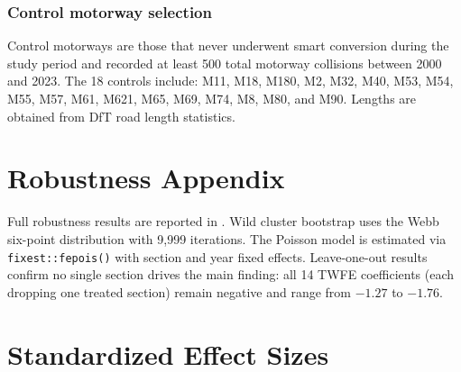 \documentclass[12pt]{article}
\begin{document}
\subsubsection*{Control motorway selection} Control motorways are those that never underwent smart conversion during the study period and recorded at least 500 total motorway collisions between 2000 and 2023. The 18 controls include: M11, M18, M180, M2, M32, M40, M53, M54, M55, M57, M61, M621, M65, M69, M74, M8, M80, and M90. Lengths are obtained from DfT road length statistics.

\section{Robustness Appendix}

Full robustness results are reported in . Wild cluster bootstrap uses the Webb six-point distribution with 9,999 iterations. The Poisson model is estimated via \texttt{fixest::fepois()} with section and year fixed effects. Leave-one-out results confirm no single section drives the main finding: all 14 TWFE coefficients (each dropping one treated section) remain negative and range from $-1.27$ to $-1.76$.

\section{Standardized Effect Sizes}
\label{sec:sde}


\end{document}

